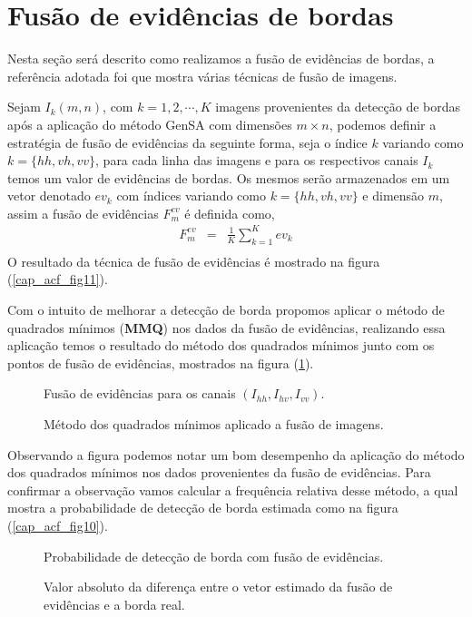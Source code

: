 \section{Fusão de evidências de bordas}

	Nesta seção será descrito como realizamos a fusão de evidências de bordas, a referência adotada foi \citet{mit} que mostra várias técnicas de fusão de imagens. 

	Sejam $I_k(m,n)$, com $k=1,2,\cdots,K$ imagens provenientes da detecção de bordas após a aplicação do método GenSA com dimensões $m \times n$, podemos definir a estratégia de fusão de evidências da seguinte forma, seja o índice $k$ variando como $k=\{hh,vh,vv\}$, para cada linha das imagens e para os respectivos canais $I_k$ temos um valor de evidências de bordas.  Os mesmos serão armazenados em um vetor denotado $ev_k$ com índices variando como $k=\{hh,vh,vv\}$ e dimensão $m$, assim a fusão de evidências $F_{m}^{ev}$ é definida como,
\begin{equation}\label{cap_acf_27}
\begin{array}{lll}
	F_{m}^{ev} &=&\frac{1}{K}\sum_{k=1}^{K}ev_k  \\
\end{array}
\end{equation}
 O resultado da técnica de fusão de evidências é mostrado na figura (\ref{cap_acf_fig11}).

Com o intuito de melhorar a detecção de borda propomos aplicar o método de quadrados mínimos (\textbf{MMQ}) nos dados da fusão de evidências, realizando essa aplicação temos o resultado do método dos quadrados mínimos junto com os pontos de fusão de evidências, mostrados na figura (\ref{cap_acf_fig12}).
\begin{figure}[hbt]
	\caption{Fusão de evidências para os canais $\left(I_{hh}, I_{hv}, I_{vv}\right)$.}
\label{cap_acf_fig11}
\endminipage\hfill
{}
\caption{Método dos quadrados mínimos aplicado a fusão de imagens.}
\label{cap_acf_fig12}
\endminipage\hfill
\end{figure}
Observando a figura podemos notar um bom desempenho da aplicação do método dos quadrados mínimos nos dados provenientes da fusão de evidências. Para confirmar a observação vamos calcular a frequência relativa desse método, a qual mostra a probabilidade de detecção de borda estimada como na figura (\ref{cap_acf_fig10}).
\begin{figure}[hbt]
	\caption{Probabilidade de detecção de borda com fusão de evidências.}
\label{cap_acf_fig13}
\endminipage\hfill
{}
	\caption{Valor absoluto da diferença entre o vetor estimado da fusão de evidências e a borda real.}
\label{cap_acf_fig14}
\endminipage\hfill
\end{figure}

